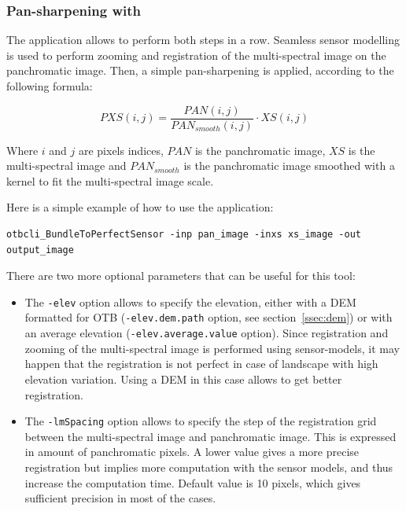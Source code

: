 \subsubsection{Pan-sharpening with \app}

The  application allows to
perform both steps in a row. Seamless sensor modelling is used to
perform zooming and registration of the multi-spectral image on the
panchromatic image. Then, a simple pan-sharpening is applied,
according to the following formula:

\begin{equation}
PXS(i,j) = \frac{PAN(i,j)}{PAN_{smooth}(i,j)} \cdot XS(i,j)
\end{equation}

Where $i$ and $j$ are pixels indices, $PAN$ is the panchromatic image,
$XS$ is the multi-spectral image and $PAN_{smooth}$ is the
panchromatic image smoothed with a kernel to fit the multi-spectral
image scale.

Here is a simple example of how to use the
 application:

\begin{verbatim}
otbcli_BundleToPerfectSensor -inp pan_image -inxs xs_image -out output_image
\end{verbatim}

There are two more optional parameters that can be useful for this
tool:
\begin{itemize}
\item The \verb?-elev? option allows to specify the elevation, either with
  a DEM formatted for OTB (\verb?-elev.dem.path? option, see 
  section~\ref{ssec:dem}) or with an average elevation (\verb?-elev.average.value? 
  option). Since registration
  and zooming of the multi-spectral image is performed using
  sensor-models, it may happen that the registration is not perfect in
  case of landscape with high elevation variation. Using a DEM in this
  case allows to get better registration.
\item The \verb?-lmSpacing? option allows to specify the step of the
  registration grid between the multi-spectral image and panchromatic
  image. This is expressed in amount of panchromatic pixels. A lower
  value gives a more precise registration but implies more computation
  with the sensor models, and thus increase the computation
  time. Default value is 10 pixels, which gives sufficient precision
  in most of the cases.
\end{itemize}

